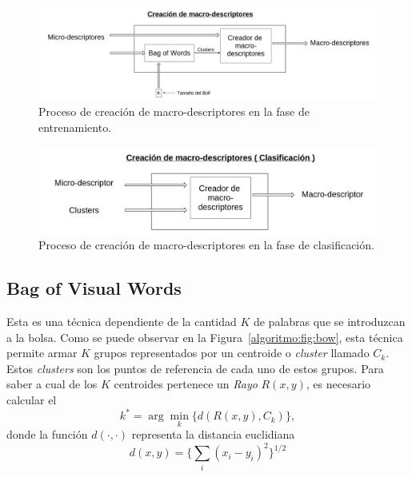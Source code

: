 	\begin{figure}[bt]
		\centering
    		\includegraphics[width=1\textwidth]{Figuras/Diagramas/Extractor_macrodescriptores_entrenamiento.png}
  		\caption{Proceso de creación de macro-descriptores en la fase de entrenamiento.}
  		\label{algoritmo:fig:macro_descriptores:entrenamiento}
	\end{figure}	
	
	
	\begin{figure}[bt]
		\centering
    		\includegraphics[width=1\textwidth]{Figuras/Diagramas/Extractor_macrodescriptores_clasificacion.png}
  		\caption{Proceso de creación de macro-descriptores en la fase de clasificación.}
  		\label{algoritmo:fig:macro_descriptores:clasificacion}
	\end{figure}	



	\subsection{Bag of Visual Words}
	\label{algoritmo:bow}
		Esta es una técnica dependiente de la cantidad $K$ de palabras que se introduzcan a la bolsa. Como se puede observar en la Figura~\ref{algoritmo:fig:bow}, esta técnica permite armar $K$ grupos representados por un centroide o \textit{cluster} llamado $C_k$. Estos \textit{clusters} son los puntos de referencia de cada uno de estos grupos. Para saber a cual de los $K$ centroides pertenece un \textit{Rayo} $R(x,y)$, es necesario calcular el
		\begin{equation}
  			\label{algoritmo:eq:dist}
			k^* = \arg \min_k \{\mathit{d}(R(x,y),C_k)\},
		\end{equation}
		donde la función $\mathit{d}(\cdot,\cdot)$ representa la distancia euclidiana 
		\begin{equation}
		 d(x,y) = \Big\{\sum_{i} (x_i-y_i)^2\Big\}^{1/2} 
		\end{equation}
		

